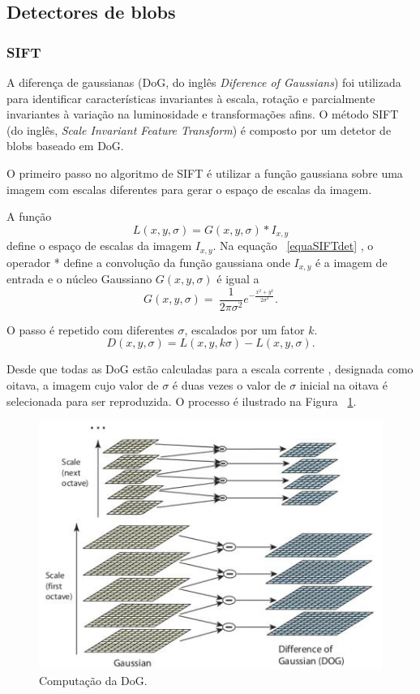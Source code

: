 \subsection{Detectores de blobs}

\subsubsection{SIFT}

A diferença de gaussianas (DoG, do inglês \textit{Diference of Gaussians}) foi utilizada para identificar características invariantes à escala, rotação e parcialmente invariantes à variação na luminosidade e transformações afins. O método SIFT (do inglês, \textit{Scale Invariant Feature Transform}) é composto por um detetor de blobs baseado em DoG.

O primeiro passo no algoritmo de SIFT é utilizar a função gaussiana sobre uma imagem com escalas diferentes para gerar o espaço de escalas da imagem.

A função \begin{equation}\label{equaSIFTdet}
\textit{L}(x,y,\sigma) = \textit{G}(x,y,\sigma)*\textit{I}_{x,y} \end{equation}
define o espaço de escalas da imagem $\textit{I}_{x,y}$. Na equação ~\ref{equaSIFTdet}
, o operador * define a convolução da função gaussiana onde $\textit{I}_{x,y}$ é a imagem de entrada e o núcleo Gaussiano $\textit{G}(x,y,\sigma)$ é igual a  \[ G( \textit{x},\textit{y},\textit{$\sigma$}) =\ \frac{1}{2\pi\sigma^2} e^{-\frac{x^2 + y^2}{2\sigma^2}} . \]

O passo é repetido com diferentes $\sigma$, escalados por um fator $\textit{k}$. \[ \textit{D}(x,y,\sigma) = \textit{L}(x,y,\textit{k}\sigma) - \textit{L}(x,y,\sigma). \]

Desde que todas as DoG estão calculadas para a escala corrente , designada como oitava, a imagem cujo valor de $\sigma$ é duas vezes o valor de $\sigma$ inicial na oitava é selecionada para ser reproduzida. O processo é ilustrado na Figura ~\ref{fig:compitation-of-dog}.

\begin{figure}[h!]
	\centering
	\includegraphics[width=0.7\linewidth]{figures/compitationofDoG}
	\caption{Computação da DoG. \cite{VisualOdometryRodasVehicles}}
	\label{fig:compitation-of-dog}
\end{figure}

